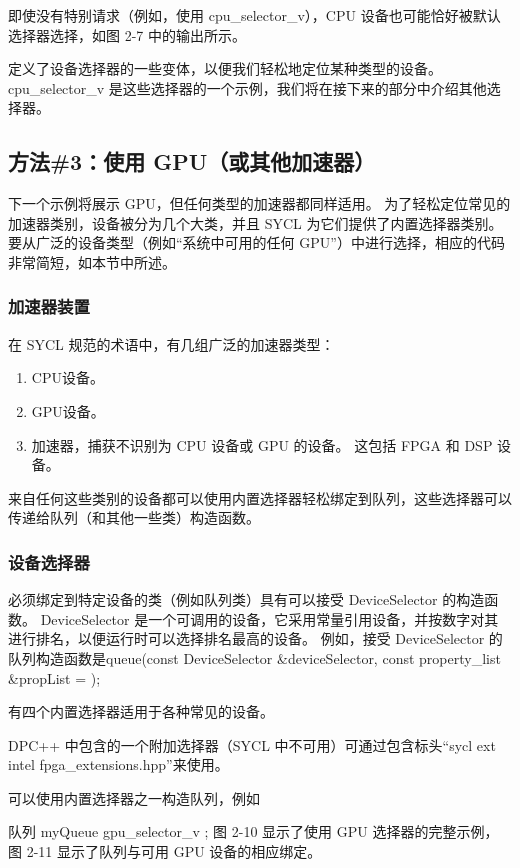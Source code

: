 即使没有特别请求（例如，使用 cpu\_selector\_v），CPU 设备也可能恰好被默认选择器选择，如图 2-7 中的输出所示。

定义了设备选择器的一些变体，以便我们轻松地定位某种类型的设备。 cpu\_selector\_v 是这些选择器的一个示例，我们将在接下来的部分中介绍其他选择器。

\subsection{方法\#3：使用 GPU（或其他加速器）}
下一个示例将展示 GPU，但任何类型的加速器都同样适用。 为了轻松定位常见的加速器类别，设备被分为几个大类，并且 SYCL 为它们提供了内置选择器类别。 要从广泛的设备类型（例如“系统中可用的任何 GPU”）中进行选择，相应的代码非常简短，如本节中所述。

\subsubsection{加速器装置}
在 SYCL 规范的术语中，有几组广泛的加速器类型：

\begin{enumerate}
	\item CPU设备。

	\item GPU设备。

	\item 加速器，捕获不识别为 CPU 设备或 GPU 的设备。 这包括 FPGA 和 DSP 设备。
\end{enumerate}

来自任何这些类别的设备都可以使用内置选择器轻松绑定到队列，这些选择器可以传递给队列（和其他一些类）构造函数。

\subsubsection{设备选择器}
必须绑定到特定设备的类（例如队列类）具有可以接受 DeviceSelector 的构造函数。 DeviceSelector 是一个可调用的设备，它采用常量引用设备，并按数字对其进行排名，以便运行时可以选择排名最高的设备。 例如，接受 DeviceSelector 的队列构造函数是queue(const DeviceSelector \&deviceSelector, const property\_list \&propList = {});

有四个内置选择器适用于各种常见的设备。

DPC++ 中包含的一个附加选择器（SYCL 中不可用）可通过包含标头“sycl\/ ext \/ intel \/ fpga\_extensions.hpp”来使用。

可以使用内置选择器之一构造队列，例如

队列 myQueue{ gpu\_selector\_v{} }; 图 2-10 显示了使用 GPU 选择器的完整示例，图 2-11 显示了队列与可用 GPU 设备的相应绑定。


